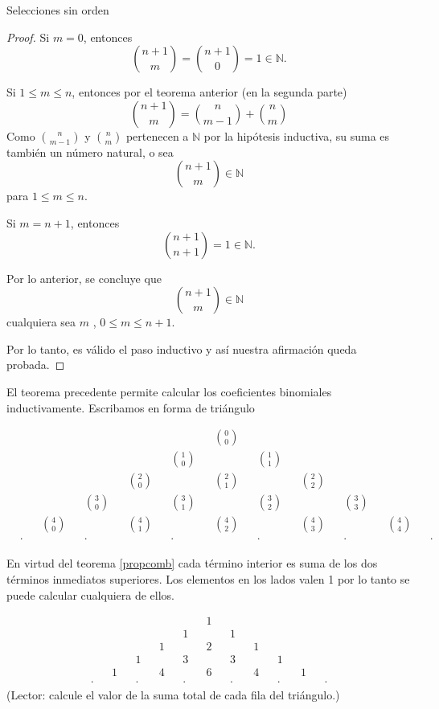 \begin{section}{Selecciones sin orden}
\begin{proof}
Si $m=0$, entonces
\begin{equation*}
	\binom{n+1}{m} = \binom{n+1}{0} =1 \in \mathbb N.
\end{equation*}


Si $1 \le m \le n$, entonces por el teorema anterior (en la segunda parte)
$$
\binom{n+1}{m} = \binom{n}{m-1} + \binom{n}{m}  
$$
Como 
$\binom{n}{m-1}$  y $\binom{n}{m}$ pertenecen  a $\mathbb  N$ por la hipótesis inductiva, su suma es también un número natural, o sea 
\begin{equation*}
	\binom{n+1}{m}   \in \mathbb N
\end{equation*}
para $1 \le m \le n$.


Si $m = n+1$, entonces 
\begin{equation*}
	\binom{n+1}{n+1} = 1  \in \mathbb N.
\end{equation*}


Por lo anterior, se concluye que
$$
\binom{n+1}{m}   \in \mathbb N
$$
cualquiera sea $m$ , $0 \le m \le n + 1$.

Por lo tanto, es válido el paso inductivo y así nuestra afirmación
queda probada.
\end{proof}

El teorema precedente permite calcular los coeficientes
binomiales inductivamente. Escribamos en forma de triángulo


\begin{align*}
&& && && && && &\binom{0}{0}& && && && && &&  \\
&& && && && &\binom{1}{0}& && &\binom{1}{1}& && && && &&  \\
&& && && &\binom{2}{0}& && &\binom{2}{1}& && &\binom{2}{2}& && && &&  \\
&& && &\binom{3}{0}& && &\binom{3}{1}& && &\binom{3}{2}& && &\binom{3}{3}& && &&  \\
&& &\binom{4}{0}& && &\binom{4}{1}& && &\binom{4}{2}& && &\binom{4}{3}& && &\binom{4}{4}& &&  \\
&\cdot& && &\cdot& && &\cdot& && &\cdot& && &\cdot& && &\cdot& 
\end{align*}



En virtud del teorema \ref{propcomb} cada término interior es
suma de los dos términos inmediatos superiores. Los elementos
en los lados valen 1 por lo tanto se puede calcular cualquiera
de ellos.


\begin{align*}
&& && && && && &1& && && && && &&  \\
&& && && && &1& && &1& && && && &&  \\
&& && && &1& && &2& && &1& && && &&  \\
&& && &1& && &3& && &3& && &1& && &&  \\
&& &1& && &4& && &6& && &4& && &1& &&  \\
&\cdot& && &\cdot& && &\cdot& && &\cdot& && &\cdot& && &\cdot& 
\end{align*}
(Lector: calcule el valor de la suma total de cada fila del triángulo.)


\end{section}
